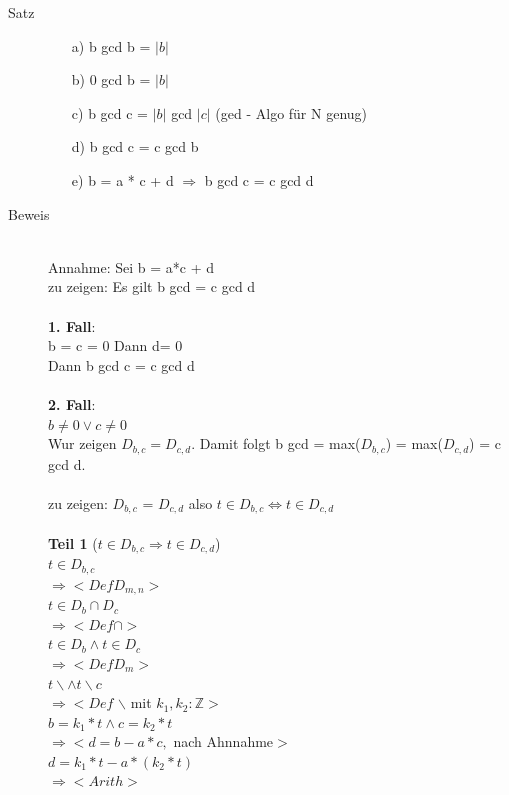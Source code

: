 \documentclass[a4paper,10pt]{article}
\newcommand{\ZN}{\mathbb{Z}} %
\newcommand{\Bold}[1]{\textbf{#1}} %
\newcommand{\Ra}{\Rightarrow}
\begin{document}
\begin{description}
	\item[Satz] \hfill
		\begin{itemize}
			\item[a)] b gcd b = $| b |$
			\item[b)] 0 gcd b = $| b |$
			\item[c)] b gcd c = $| b |$ gcd $| c |$ (ged - Algo f\"ur N genug)
			\item[d)] b gcd c = c gcd b
			\item[e)] b = a * c + d $\Ra$ b gcd c = c gcd d
		\end{itemize}
	\item[Beweis] \hfill \\
		Annahme: Sei b = a*c + d \\
		zu zeigen: Es gilt b gcd = c gcd d \\
		\\
		\Bold {1. Fall}: \\
		b = c = 0 Dann d= 0 \\
		Dann b gcd c = c gcd d\\
		\\
		\Bold {2. Fall}: \\
		$b \neq 0 \vee c \neq 0$ \\
		Wur zeigen $D_{b,c} = D_{c,d}$. Damit folgt b gcd = max($D_{b,c}$) = max($D_{c,d}$) = c gcd d. \\
		\\
		zu zeigen: $D_{b,c}$ = $D_{c,d}$ also $t \in D_{b,c} \Leftrightarrow t \in D_{c,d}$ \\
\\		
	\Bold {Teil 1} ($t \in D_{b,c} \Ra t \in D_{c,d}$) \\
	$t \in D_{b,c}$ \\
	$\Ra <Def D_{m,n}>$ \\
	$t \in D_b \cap D_c$ \\
	$\Ra < Def \cap>$ \\
	$t \in D_b \wedge t \in D_c$ \\
	$\Ra <Def D_m>$ \\
	$t\backslash \wedge t \backslash c$ \\
	$\Ra < Def$ $\backslash$ mit $k_1,k_2:\ZN>$ \\
	$b = k_1 * t \wedge c = k_2 * t$ \\
	$\Ra < d= b- a*c,$ nach Ahnnahme$>$ \\
	$d = k_1*t - a*(k_2*t)$ \\
	$\Ra <Arith>$ \\

\end{description}
\end{document}
